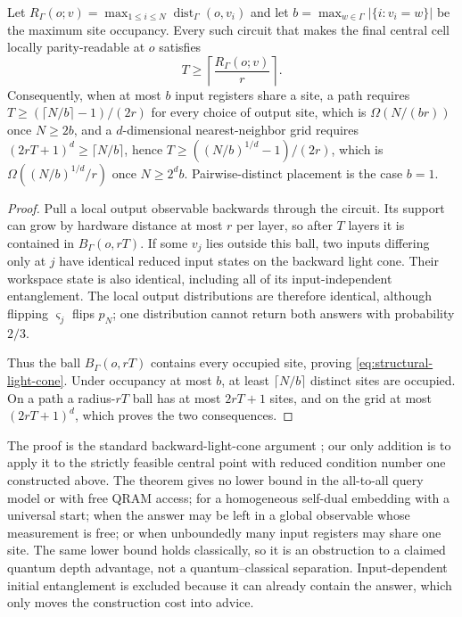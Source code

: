 \begin{theorem}
\label{thm:structural-light-cone}
Let $R_\Gamma(o;v)=\max_{1\leq i\leq N}\operatorname{dist}_\Gamma(o,v_i)$
and let $b=\max_{w\in\Gamma}|\{i:v_i=w\}|$ be the maximum site occupancy.
Every such circuit that makes the final central cell locally
parity-readable at $o$ satisfies
\begin{equation}
 \boxed{T\geq\left\lceil\frac{R_\Gamma(o;v)}{r}\right\rceil.}
                                                          \label{eq:structural-light-cone}
\end{equation}
Consequently, when at most $b$ input registers share a site, a path
requires $T\geq(\lceil N/b\rceil-1)/(2r)$ for every choice of output site,
which is $\Omega(N/(br))$ once $N\ge2b$, and a $d$-dimensional
nearest-neighbor grid requires $(2rT+1)^d\geq\lceil N/b\rceil$, hence
$T\ge((N/b)^{1/d}-1)/(2r)$, which is $\Omega((N/b)^{1/d}/r)$ once
$N\ge2^db$.
Pairwise-distinct placement is the case $b=1$.
\end{theorem}

\begin{proof}
Pull a local output observable backwards through the circuit.  Its support
can grow by hardware distance at most $r$ per layer, so after $T$ layers it
is contained in $B_\Gamma(o,rT)$.  If some $v_j$ lies outside this ball, two
inputs differing only at $j$ have identical reduced input states on the
backward light cone.  Their workspace state is also identical, including
all of its input-independent entanglement.  The local output distributions
are therefore identical, although flipping $\varsigma_j$ flips $p_N$; one
distribution cannot return both answers with probability $2/3$.

Thus the ball $B_\Gamma(o,rT)$ contains every occupied site, proving
\eqref{eq:structural-light-cone}.  Under occupancy at most $b$, at least
$\lceil N/b\rceil$ distinct sites are occupied.  On a path a radius-$rT$
ball has at most $2rT+1$ sites, and on the grid at most $(2rT+1)^d$, which
proves the two consequences.
\end{proof}

The proof is the standard backward-light-cone argument
\cite{barak2022-classical-algorithms-and-quantum-limitations}; our only
addition is to apply it to the strictly feasible central point with reduced
condition number one constructed above.  The theorem gives no lower bound
in the all-to-all query model or with free QRAM access; for a homogeneous
self-dual embedding with a universal start; when the answer may be left in
a global observable whose measurement is free; or when unboundedly many
input registers may share one site.  The same lower bound holds classically, so it
is an obstruction to a claimed quantum depth advantage, not a
quantum--classical separation.  Input-dependent initial entanglement is
excluded because it can already contain the answer, which only moves the
construction cost into advice.

